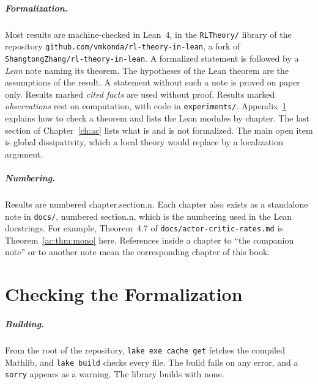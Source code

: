 \documentclass[11pt,oneside]{book}
\theoremstyle{definition}
\theoremstyle{remark}
\numberwithin{equation}{chapter}
\begin{document}
\paragraph{Formalization.} Most results are machine-checked in Lean~4, in the
\texttt{RLTheory/} library of the repository \texttt{github.com/vmkonda/rl-theory-in-lean}, a
fork of \texttt{ShangtongZhang/rl-theory-in-lean}. A formalized statement is followed by a
\emph{Lean} note naming its theorem. The hypotheses of the Lean theorem are the assumptions of
the result. A statement without such a note is proved on paper only. Results marked
\emph{cited facts} are used without proof. Results marked \emph{observations} rest on
computation, with code in \texttt{experiments/}. Appendix~\ref{app:lean} explains how to check a
theorem and lists the Lean modules by chapter. The last section of Chapter~\ref{ch:ac} lists what
is and is not formalized. The main open item is global dissipativity, which a local theory would
replace by a localization argument.

\paragraph{Numbering.} Results are numbered chapter.section.n. Each chapter also exists as a
standalone note in \texttt{docs/}, numbered section.n, which is the numbering used in the Lean
docstrings. For example, Theorem~4.7 of \texttt{docs/actor-critic-rates.md} is
Theorem~\ref{ac:thm:mono} here. References inside a chapter to ``the companion note'' or to
another note mean the corresponding chapter of this book.

\tableofcontents

\mainmatter






\appendix
\chapter{Checking the Formalization}\label{app:lean}

\paragraph{Building.} From the root of the repository, \texttt{lake exe cache get} fetches the
compiled Mathlib, and \texttt{lake build} checks every file. The build fails on any error, and a
\texttt{sorry} appears as a warning. The library builds with none.
\end{document}
